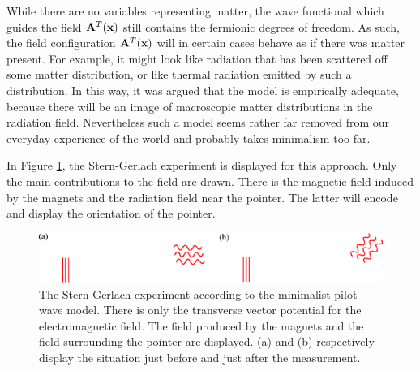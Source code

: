 \documentclass[11pt]{article}
\begin{document}
While there are no variables representing matter, the wave functional which guides the field ${\bf A}^T({\bf x})$ still contains the fermionic degrees of freedom. As such, the field configuration ${\bf A}^T({\bf x})$ will in certain cases behave as if there was matter present. For example, it might look like radiation that has been scattered off some matter distribution, or like thermal radiation emitted by such a distribution. In this way, it was argued that the model is empirically adequate, because there will be an image of macroscopic matter distributions in the radiation field. Nevertheless such a model seems rather far removed from our everyday experience of the world and probably takes minimalism too far.

In Figure \ref{minimalist}, the Stern-Gerlach experiment is displayed for this approach. Only the main contributions to the field are drawn. There is the magnetic field induced by the magnets and the radiation field near the pointer. The latter will encode and display the orientation of the pointer.

\begin{figure}
\begin{center}
\includegraphics[width=\textwidth]{minimalist.eps}
\end{center}
\caption{\label{minimalist}The Stern-Gerlach experiment according to the minimalist pilot-wave model. There is only the transverse vector potential for the electromagnetic field. The field produced by the magnets and the field surrounding the pointer are displayed. (a) and (b) respectively display the situation just before and just after the measurement.}
\end{figure}
\end{document}
